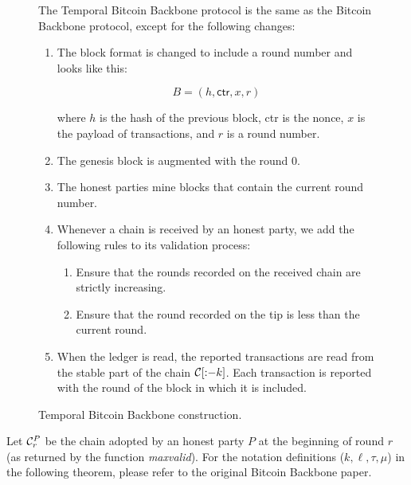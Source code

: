 \begin{figure}

  The Temporal Bitcoin Backbone protocol is the same as the Bitcoin Backbone protocol, except
  for the following changes:

  \begin{enumerate}
    \item The block format is changed to include a round number and looks like this:

    \[
      B = (h, \textsf{ctr}, x, r)
    \]

    where $h$ is the hash of the previous block, \textsf{ctr} is the nonce, $x$ is the
    payload of transactions, and $r$ is a round number.

    \item The genesis block is augmented with the round $0$.
    \item The honest parties mine blocks that contain the current round number.
    \item Whenever a chain is received by an honest party, we add the following rules to
          its validation process:

          \begin{enumerate}
            \item Ensure that the rounds recorded on the received chain are strictly
                  increasing.
            \item Ensure that the round recorded on the tip is less than the current round.
          \end{enumerate}
    \item When the ledger is \textsf{read}, the reported transactions are read from the
          stable part of the chain $\mathcal{C}[{:}{-k}]$. Each transaction is reported with the
          round of the block in which it is included.
  \end{enumerate}
  \caption{Temporal Bitcoin Backbone construction.}
  \label{fig.temporal-backbone}
\end{figure}

Let $\mathcal{C}^P_r$ be the chain adopted by an honest party $P$ at the
beginning of round $r$ (as returned by the function \emph{maxvalid}).
For the notation definitions ($k, \ell, \tau, \mu$)
in the following theorem, please refer to the original Bitcoin
Backbone paper.

